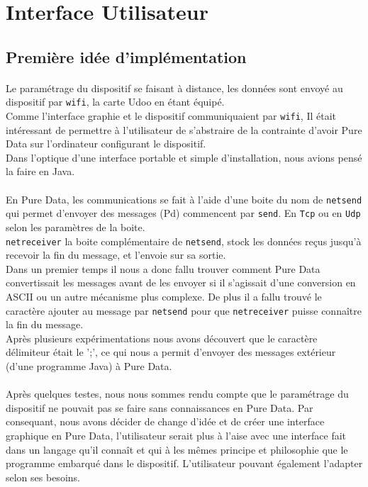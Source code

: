 \documentclass[a4paper, titlepage, oneside, 12pt]{article}%
\begin{document}
\section{Interface Utilisateur}
\subsection{Première idée d’implémentation}
\paragraph{}
Le paramétrage du dispositif se faisant à distance, les données sont envoyé au dispositif par \texttt{wifi}, la carte Udoo en étant équipé.\\
Comme l'interface graphie et le dispositif communiquaient par \texttt{wifi}, Il était intéressant de permettre à l'utilisateur de s'abstraire de la contrainte d'avoir Pure Data sur l'ordinateur configurant le dispositif. \\
Dans l'optique d'une interface portable et simple d'installation, nous avions pensé la faire en Java.
\paragraph{}
En Pure Data, les communications se fait à l'aide d'une boite du nom de \texttt{netsend} qui permet d'envoyer des messages (Pd) commencent par \texttt{send}. En \texttt{Tcp} ou en \texttt{Udp} selon les paramètres de la boite.\\
\texttt{netreceiver} la boite complémentaire de \texttt{netsend}, stock les données reçus jusqu’à recevoir la fin du message, et l'envoie sur sa sortie.\\
Dans un premier temps il nous a donc fallu trouver comment Pure Data convertissait les messages avant de les envoyer si il s’agissait d'une conversion en ASCII ou un autre  mécanisme plus complexe. De plus il a fallu trouvé le caractère ajouter au message par \texttt{netsend} pour que   \texttt{netreceiver} puisse connaître la fin du message.\\
Après plusieurs expérimentations nous avons découvert que le caractère délimiteur était  le ';', ce qui nous a permit d'envoyer des messages extérieur (d'une programme Java) à Pure Data.

\paragraph{}
Après quelques testes, nous nous sommes rendu compte que le paramétrage du dispositif ne pouvait pas se faire sans connaissances en Pure Data. Par consequant, nous avons décider de change d'idée et de créer une interface graphique en Pure Data, l'utilisateur serait plus à l'aise avec une interface fait dans un langage qu'il connaît et qui à les mêmes principe et philosophie que le programme embarqué dans le dispositif. L'utilisateur pouvant également l’adapter selon ses besoins.
\end{document}
